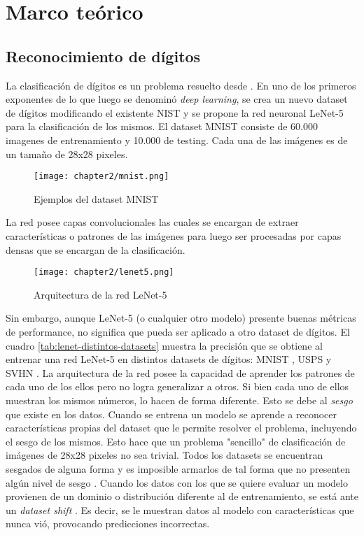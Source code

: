 \chapter{Marco te\'orico}
\label{Chapter2}

\section{Reconocimiento de d\'igitos}

La clasificaci\'on de d\'igitos es un problema resuelto desde \citeyear{lecun1998gradient}. En uno de los primeros
exponentes de lo que luego se denomin\'o {\it deep learning}, \cite{lecun1998gradient} se crea un nuevo dataset de
d\'igitos modificando el existente NIST y se propone la red neuronal LeNet-5 para la clasificaci\'on de los mismos. El
dataset MNIST consiste de 60.000 imagenes de entrenamiento y 10.000 de testing. Cada una de las im\'agenes es de un
tama\~{n}o de 28x28 pixeles.

\begin{figure}[H]
    \centering
    \texttt{[image: chapter2/mnist.png]}
    \caption{Ejemplos del dataset MNIST}
    \label{fig:mnist}
\end{figure}

La red posee capas convolucionales las cuales se encargan de extraer caracter\'isticas o patrones de las im\'agenes
para luego ser procesadas por capas densas que se encargan de la clasificaci\'on.

\begin{figure}[H]
    \centering
    \texttt{[image: chapter2/lenet5.png]}
    \caption{Arquitectura de la red LeNet-5}
    \label{fig:lenet-5}
\end{figure}

Sin embargo, aunque LeNet-5 (o cualquier otro modelo) presente buenas m\'etricas de performance, no significa que pueda
ser aplicado a otro dataset de d\'igitos. El cuadro \ref{tab:lenet-distintos-datasets} muestra la precisi\'on que se
obtiene al entrenar una red LeNet-5 en distintos datasets de d\'igitos: MNIST \parencite{lecun1998gradient}, USPS \parencite{hull1994database} y SVHN \parencite{netzer2011reading}. La arquitectura de la red posee la capacidad de aprender los patrones de cada uno de los
ellos pero no logra generalizar a otros. Si bien cada uno de ellos muestran los mismos n\'umeros, lo hacen de forma
diferente. Esto se debe al {\it sesgo} que existe en los datos. Cuando se entrena un modelo se aprende a reconocer
caracter\'isticas propias del dataset que le permite resolver el problema, incluyendo el sesgo de los mismos. Esto hace
que un problema "sencillo" de clasificaci\'on de im\'agenes de 28x28 pixeles no sea trivial. Todos los datasets se
encuentran sesgados de alguna forma y es imposible armarlos de tal forma que no presenten alg\'un nivel de sesgo \parencite{khosla2012undoing}. Cuando los datos con los que se quiere evaluar un modelo provienen de un dominio o
distribuci\'on diferente al de entrenamiento, se est\'a ante un {\it dataset shift} \parencite{quinonero2008dataset}. Es decir, se le muestran datos al modelo con caracter\'isticas que nunca vi\'o,
provocando predicciones incorrectas.


